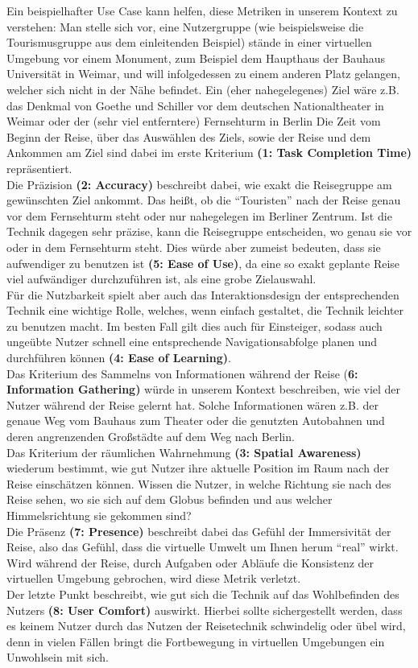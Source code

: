 Ein beispielhafter Use Case kann helfen, diese Metriken in unserem Kontext zu verstehen:
Man stelle sich vor, eine Nutzergruppe (wie beispielsweise die Tourismusgruppe aus dem einleitenden Beispiel) stände in einer virtuellen Umgebung vor einem Monument, zum Beispiel dem Haupthaus der Bauhaus Universität in Weimar, und will infolgedessen zu einem anderen Platz gelangen, welcher sich nicht in der Nähe befindet. Ein (eher nahegelegenes) Ziel wäre z.B. das Denkmal von Goethe und Schiller vor dem deutschen Nationaltheater in Weimar oder der (sehr viel entferntere) Fernsehturm in Berlin
Die Zeit vom Beginn der Reise, über das Auswählen des Ziels, sowie der Reise und dem Ankommen am Ziel sind dabei im erste Kriterium \textbf{(1: Task Completion Time)} repräsentiert.\\
Die Präzision \textbf{(2: Accuracy)} beschreibt dabei, wie exakt die Reisegruppe am gewünschten Ziel ankommt. Das heißt, ob die “Touristen” nach der Reise genau vor dem Fernsehturm steht oder nur nahegelegen im Berliner Zentrum. Ist die Technik dagegen sehr präzise, kann die Reisegruppe entscheiden, wo genau sie vor oder in dem Fernsehturm steht. Dies würde aber zumeist bedeuten, dass sie aufwendiger zu benutzen ist \textbf{(5: Ease of Use)}, da eine so exakt geplante Reise viel aufwändiger durchzuführen ist, als eine grobe Zielauswahl.\\
Für die Nutzbarkeit spielt aber auch das Interaktionsdesign der entsprechenden Technik eine wichtige Rolle, welches, wenn einfach gestaltet, die Technik leichter zu benutzen macht. Im besten Fall gilt dies auch für Einsteiger, sodass auch ungeübte Nutzer schnell eine entsprechende Navigationsabfolge planen und durchführen können \textbf{(4: Ease of Learning)}.\\
Das Kriterium des Sammelns von Informationen während der Reise (\textbf{6: Information Gathering)} würde in unserem Kontext beschreiben, wie viel der Nutzer während der Reise gelernt hat. Solche Informationen wären z.B. der genaue Weg vom Bauhaus zum Theater oder die genutzten Autobahnen und deren angrenzenden Großstädte auf dem Weg nach Berlin.\\
Das Kriterium der räumlichen Wahrnehmung \textbf{(3: Spatial Awareness)} wiederum bestimmt, wie gut Nutzer ihre aktuelle Position im Raum nach der Reise einschätzen können. Wissen die Nutzer, in welche Richtung sie nach des Reise sehen, wo sie sich auf dem Globus befinden und aus welcher Himmelsrichtung sie gekommen sind?\\
Die Präsenz \textbf{(7: Presence)} beschreibt dabei das Gefühl der Immersivität der Reise, also das Gefühl, dass die virtuelle Umwelt um Ihnen herum “real” wirkt. Wird während der Reise, durch Aufgaben oder Abläufe die Konsistenz der virtuellen Umgebung gebrochen, wird diese Metrik verletzt.\\
Der letzte Punkt beschreibt, wie gut sich die Technik auf das Wohlbefinden des Nutzers \textbf{(8: User Comfort)} auswirkt. Hierbei sollte sichergestellt werden, dass es keinem Nutzer durch das Nutzen der Reisetechnik schwindelig oder übel wird, denn in vielen Fällen bringt die Fortbewegung in virtuellen Umgebungen ein Unwohlsein mit sich.

